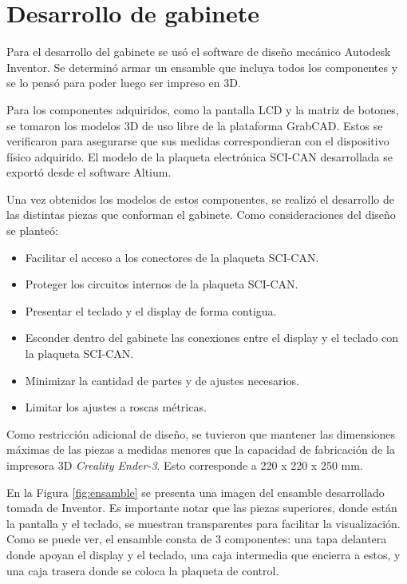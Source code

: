 \section{Desarrollo de gabinete}

Para el desarrollo del gabinete se usó el software de diseño mecánico Autodesk Inventor\citep{web_inventor}. Se determinó armar un ensamble que incluya todos los componentes y se lo pensó para poder luego ser impreso en 3D.

Para los componentes adquiridos, como la pantalla LCD y la matriz de botones, se tomaron los modelos 3D de uso libre de la plataforma GrabCAD\citep{web_grabcad}. Estos se verificaron para asegurarse que sus medidas correspondieran con el dispositivo físico adquirido. El modelo de la plaqueta electrónica SCI-CAN desarrollada se exportó desde el software Altium.

Una vez obtenidos los modelos de estos componentes, se realizó el desarrollo de las distintas piezas que conforman el gabinete. Como consideraciones del diseño se planteó:

\begin{itemize}
	\item Facilitar el acceso a los conectores de la plaqueta SCI-CAN.
	\item Proteger los circuitos internos de la plaqueta SCI-CAN.
	\item Presentar el teclado y el display de forma contigua.
	\item Esconder dentro del gabinete las conexiones entre el display y el teclado con la plaqueta SCI-CAN.
	\item Minimizar la cantidad de partes y de ajustes necesarios.
	\item Limitar los ajustes a roscas métricas.
\end{itemize}

Como restricción adicional de diseño, se tuvieron que mantener las dimensiones máximas de las piezas a medidas menores que la capacidad de fabricación de la impresora 3D \textit{Creality Ender-3}\citep{web_ender3}. Esto corresponde a 220 x 220 x 250 mm.

En la Figura \ref{fig:ensamble} se presenta una imagen del ensamble desarrollado tomada de Inventor. Es importante notar que las piezas superiores, donde están la pantalla y el teclado, se muestran transparentes para facilitar la visualización. Como se puede ver, el ensamble consta de 3 componentes: una tapa delantera donde apoyan el display y el teclado, una caja intermedia que encierra a estos, y una caja trasera donde se coloca la plaqueta de control.

